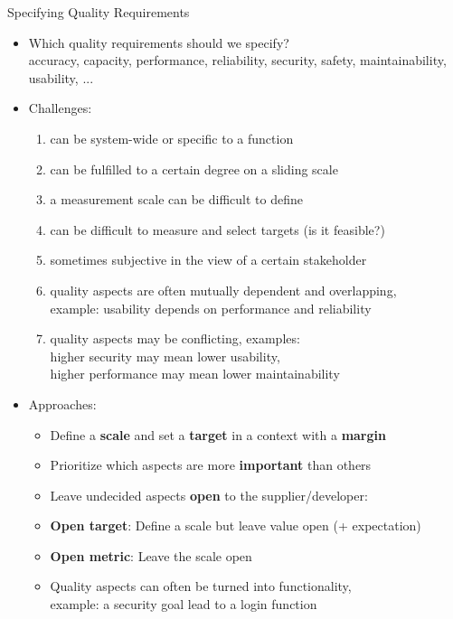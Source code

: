\documentclass{simpleslides}
\begin{document}
\begin{frame}[fragile]{Specifying Quality Requirements}
\begin{itemize}\small
\item Which quality requirements should we specify? \\ {\footnotesize 
accuracy, capacity, performance, reliability, security, safety, maintainability, usability, ... }
\item Challenges:
\begin{enumerate}\footnotesize
\item can be system-wide or specific to a function
\item can be fulfilled to a certain degree on a sliding scale
\item a measurement scale can be difficult to define
\item can be difficult to measure and select targets (is it feasible?)
\item sometimes subjective in the view of a certain stakeholder
\item quality aspects are often mutually dependent and overlapping,\\
      example: usability depends on performance and reliability
\item quality aspects may be conflicting, examples: \\ higher security may mean lower usability, \\ higher performance may mean lower maintainability
\end{enumerate}
\item Approaches:
\begin{itemize}\footnotesize
\item Define a \textbf{scale} and set a \textbf{target} in a context with a \textbf{margin}
\item Prioritize which aspects are more \textbf{important} than others
\item Leave undecided aspects \textbf{open} to the supplier/developer:
\item[] \textbf{Open target}: Define a scale but leave value open (+ expectation)
\item[] \textbf{Open metric}: Leave the scale open
\item Quality aspects can often be turned into functionality,\\
      example: a security goal lead to a login function
\end{itemize}
\end{itemize}
\end{frame}
\end{document}
